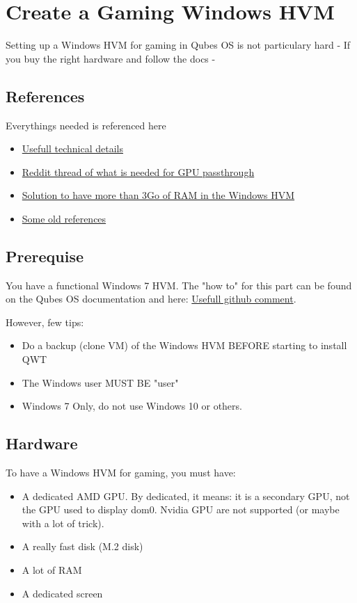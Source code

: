 \documentclass[12pt]{article}
\begin{document}

\section{Create a Gaming Windows HVM}
Setting up a Windows HVM for gaming in Qubes OS is not particulary hard - If you buy the right hardware and follow the docs -
\subsection{References}
Everythings needed is referenced here
\begin{itemize}
  \item \href{https://paste.debian.net/1043341/}{Usefull technical details}
  \item \href{https://www.reddit.com/r/Qubes/comments/9hp3e7/gpu\_passthrough\_howto/}{Reddit thread of what is needed for GPU passthrough}
  \item \href{https://github.com/QubesOS/qubes-issues/issues/4321\#issuecomment-423011787}{Solution to have more than 3Go of RAM in the Windows HVM}
  \item \href{https://www.reddit.com/r/Qubes/comments/66wk4q/gpu\_passthrough/}{Some old references}
\end{itemize}

\subsection{Prerequise}
You have a functional Windows 7 HVM.
The "how to" for this part can be found on the Qubes OS documentation and here:
\href{https://github.com/QubesOS/qubes-issues/issues/3585\#issuecomment-453200971}{Usefull github comment}.

However, few tips:
\begin{itemize}
  \item Do a backup (clone VM) of the Windows HVM BEFORE starting to install QWT
  \item The Windows user MUST BE "user"
  \item Windows 7 Only, do not use Windows 10 or others.
\end{itemize}

\subsection{Hardware}
To have a Windows HVM for gaming, you must have:
\begin{itemize}
  \item A dedicated AMD GPU.
    By dedicated, it means: it is a secondary GPU, not the GPU used to display dom0.
    Nvidia GPU are not supported (or maybe with a lot of trick).
  \item A really fast disk (M.2 disk)
  \item A lot of RAM
  \item A dedicated screen
\end{itemize}
\end{document}
